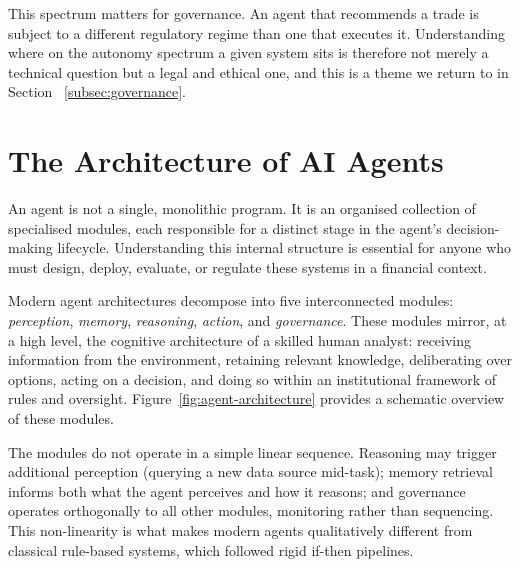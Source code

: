 \documentclass{article}
\begin{document}
This spectrum matters for governance. An agent that recommends a trade is subject to a different regulatory regime than one that executes it. Understanding where on the autonomy spectrum a given system sits is therefore not merely a technical question but a legal and ethical one, and this is a theme we return to in Section ~\ref{subsec:governance}.

\section{The Architecture of AI Agents}
\label{sec:architecture}

An agent is not a single, monolithic program. It is an organised collection of specialised modules, each responsible for a distinct stage in the agent's decision-making lifecycle. Understanding this internal structure is essential for anyone who must design, deploy, evaluate, or regulate these systems in a financial context.

Modern agent architectures decompose into five interconnected modules: \textit{perception}, \textit{memory}, \textit{reasoning}, \textit{action}, and \textit{governance}. These modules mirror, at a high level, the cognitive architecture of a skilled human analyst: receiving information from the environment, retaining relevant knowledge, deliberating over options, acting on a decision, and doing so within an institutional framework of rules and oversight. Figure~\ref{fig:agent-architecture} provides a schematic overview of these modules.

The modules do not operate in a simple linear sequence. Reasoning may trigger additional perception (querying a new data source mid-task); memory retrieval informs both what the agent perceives and how it reasons; and governance operates orthogonally to all other modules, monitoring rather than sequencing. This non-linearity is what makes modern agents qualitatively different from classical rule-based systems, which followed rigid if-then pipelines.
\end{document}
